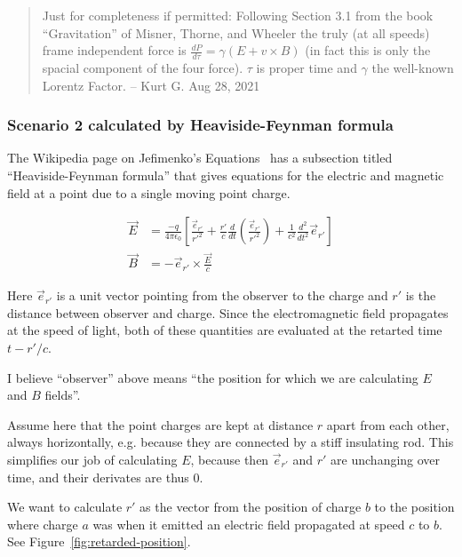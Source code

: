 \documentclass[a4paper]{article}
\theoremstyle{plain}
\theoremstyle{definition}
\newcommand{\vect}[1]{\vec{#1}}
\begin{document}
\begin{quote}
Just for completeness if permitted: Following Section 3.1 from the
book ``Gravitation'' of Misner, Thorne, and Wheeler the truly (at all
speeds) frame independent force is $\frac{dP}{d \tau} = \gamma (E + v
\times B)$ (in fact this is only the spacial component of the four
force).  $\tau$ is proper time and $\gamma$ the well-known Lorentz
Factor. -- Kurt G. Aug 28, 2021
\end{quote}


\subsubsection{Scenario 2 calculated by Heaviside-Feynman formula}

The Wikipedia page on Jefimenko's Equations~\cite{JefimenkosEquations}
has a subsection titled ``Heaviside-Feynman formula'' that gives
equations for the electric and magnetic field at a point due to a
single moving point charge.

\begin{align}
\vect{E} & = \frac{-q}{4 \pi \epsilon_0}
             \left[
               \frac{\vect{e}_{r'}}{r'^2}
               + \frac{r'}{c} \frac{d}{dt} \left( \frac{\vect{e}_{r'}}{r'^2} \right)
               + \frac{1}{c^2} \frac{d^2}{dt^2} \vect{e}_{r'}
             \right]
             \label{eq:HF-EforPtChg} \\
\vect{B} & = - \vect{e}_{r'} \times \frac{\vect{E}}{c}
             \label{eq:HF-BforPtChg}
\end{align}

Here $\vect{e}_{r'}$ is a unit vector pointing from the observer to
the charge and $r'$ is the distance between observer and charge.
Since the electromagnetic field propagates at the speed of light, both
of these quantities are evaluated at the retarted time $t - r'/c$.

I believe ``observer'' above means ``the position for which we are
calculating $E$ and $B$ fields''.

Assume here that the point charges are kept at distance $r$ apart from
each other, always horizontally, e.g. because they are connected by a
stiff insulating rod.  This simplifies our job of calculating $E$,
because then $\vect{e}_{r'}$ and $r'$ are unchanging over time, and
their derivates are thus 0.

We want to calculate $r'$ as the vector from the position of charge
$b$ to the position where charge $a$ was when it emitted an electric
field propagated at speed $c$ to $b$.  See
Figure~\ref{fig:retarded-position}.
\end{document}
